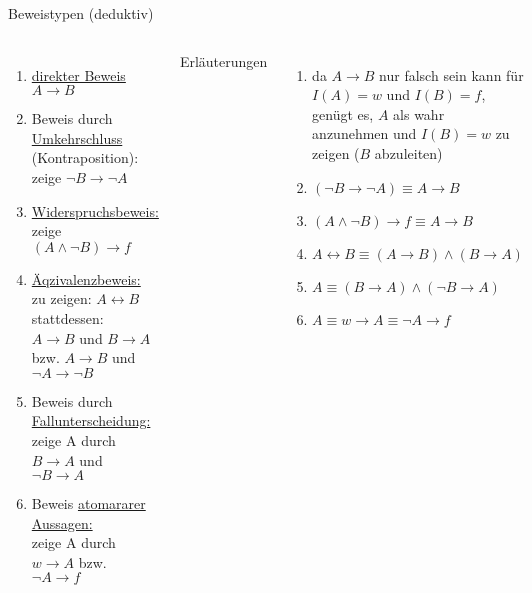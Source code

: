 \begin{frame}[shrink=5]{Beweistypen (deduktiv)}
	\begin{columns}
			\begin{enumerate}
				\item \underline{direkter Beweis} $A \rightarrow B$
				\item Beweis durch \underline{Umkehrschluss} (Kontraposition): zeige $\neg B \rightarrow \neg A$
				\item \underline{Widerspruchsbeweis:} zeige $(A \land \neg B) \rightarrow f$
				\item \underline{Äqzivalenzbeweis:}\\
				zu zeigen: $A \leftrightarrow B$\\
				stattdessen:\\
				$A \rightarrow B$ und $B \rightarrow A$ bzw. $A \rightarrow B$ und $\neg A \rightarrow \neg B$
				\item Beweis durch \underline{Fallunterscheidung:}\\
				zeige A durch $B \rightarrow A$ und $\neg B \rightarrow A$
				\item Beweis \underline{atomararer Aussagen:}\\
				zeige A durch $w \rightarrow A$ bzw. $\neg A \rightarrow f$
			\end{enumerate}
			Erläuterungen
			\begin{enumerate}
				\item da $A \rightarrow B$ nur falsch sein kann für $I(A)=w$ und $I(B)=f$, genügt es, $A$ als wahr anzunehmen und $I(B)=w$ zu zeigen ($B$ abzuleiten)
				\item $(\neg B \rightarrow \neg A) \equiv A \rightarrow B$
				\item $(A \land \neg B) \rightarrow f \equiv A \rightarrow B$
				\item $A \leftrightarrow B \equiv (A \rightarrow B) \land (B \rightarrow A)$
				\item $A \equiv (B \rightarrow A) \land (\neg B \rightarrow A)$
				\item $A \equiv w \rightarrow A \equiv \neg A \rightarrow f$
			\end{enumerate}
	\end{columns}
\end{frame}


